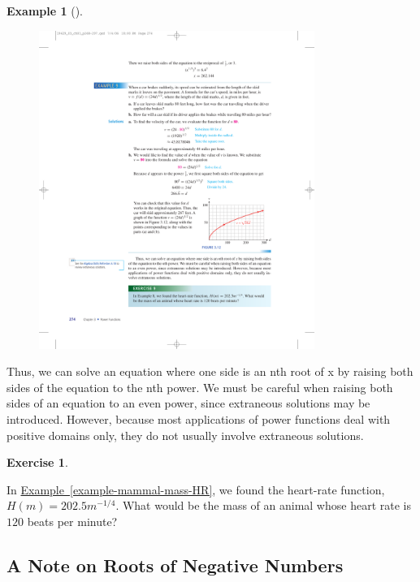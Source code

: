 \documentclass[10pt,]{book}
\theoremstyle{plain}
\theoremstyle{definition}
\theoremstyle{definition}
\theoremstyle{definition}
\newtheorem{example}[theorem]{Example}
\theoremstyle{definition}
\theoremstyle{definition}
\newtheorem{exercise}[theorem]{Exercise}
\numberwithin{equation}{section}
\begin{document}
\begin{example}[]
\begin{enumerate}[label=*\alph**]
    \leavevmode%
\begin{figure}
\centering
\includegraphics[width=0.80\textwidth,]{images/fig-velocity-vs-braking-distance.pdf}\caption{\label{fig-velocity-vs-braking-distance}}
\end{figure}
\end{enumerate}
\end{example}
\par

    Thus, we can solve an equation where one side is an nth root of x by raising both sides of the equation to the nth power. We must be careful when raising both sides of an equation to an even power, since extraneous solutions may be introduced. However, because most applications of power functions deal with positive domains only, they do not usually involve extraneous solutions.
%
\begin{exercise}\label{exercise-mammal-mass-HR}

    In \hyperref[example-mammal-mass-HR]{Example~\ref{example-mammal-mass-HR}}, we found the heart-rate function, \(H(m) = 202.5m^{−1/4}\). What would be the mass of an animal whose heart rate is \(120\) beats per minute?
\end{exercise}
\typeout{************************************************}
\typeout{************************************************}
\subsection[A Note on Roots of Negative Numbers]{A Note on Roots of Negative Numbers}\label{Roots-of-Negative-Numbers}
\end{document}
